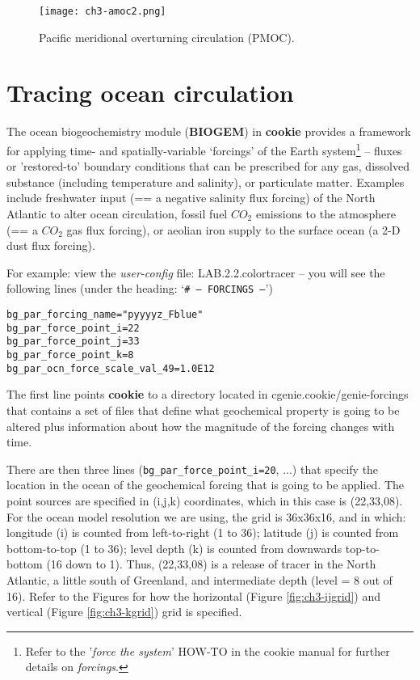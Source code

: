 \begin{figure}
\texttt{[image: ch3-amoc2.png]}\centering
\vspace{-0mm}
\caption{Pacific meridional overturning circulation (PMOC).}
\label{fig:ch3-amoc2}
\end{figure}

\newpage

\section{Tracing ocean circulation}

The ocean biogeochemistry module (\textbf{BIOGEM}) in \textbf{cookie} provides a framework for applying time- and spatially-variable ‘forcings’ of the Earth system\footnote{Refer to the '\textit{force the system}' \textsf{HOW-TO} in the cookie manual for further details on \textit{forcings}.} – fluxes or 'restored-to' boundary conditions that can be prescribed for any gas, dissolved substance (including temperature and salinity), or particulate matter. Examples include freshwater input (== a negative salinity flux forcing) of the North Atlantic to alter ocean circulation, fossil fuel \(CO_{2}\) emissions to the atmosphere (== a \(CO_{2}\) gas flux forcing), or aeolian iron supply to the surface ocean (a 2-D dust flux forcing).

\vspace{1mm}
For example: view the \textit{user-config} file: \textsf{\footnotesize LAB.2.2.colortracer} – you will see the following lines (under the heading: ‘\texttt{\# --- FORCINGS ---}’)

\vspace{-2mm}\small
\begin{verbatim}
bg_par_forcing_name="pyyyyz_Fblue"
bg_par_force_point_i=22
bg_par_force_point_j=33
bg_par_force_point_k=8
bg_par_ocn_force_scale_val_49=1.0E12
\end{verbatim}
\normalsize\vspace{-2mm}

The first line points \textbf{cookie} to a directory located in \textsf{\footnotesize cgenie.cookie/genie-forcings} that contains a set of files that define what geochemical property is going to be altered plus information about how the magnitude of the forcing changes with time.

There are then three lines (\texttt{bg\_par\_force\_point\_i=20}, ...) that specify the location in the ocean of the geochemical forcing that is going to be applied. The point sources are specified in (i,j,k) coordinates, which in this case is (22,33,08). For the ocean model resolution we are using, the grid is 36x36x16, and in which: longitude (i) is counted from left-to-right (1 to 36); latitude (j) is counted from bottom-to-top (1 to 36); level depth (k) is counted from downwards top-to-bottom (16 down to 1). Thus, (22,33,08) is a release of tracer in the North Atlantic, a little south of Greenland, and intermediate depth (level = 8 out of 16). Refer to the Figures for how the horizontal (Figure \ref{fig:ch3-ijgrid}) and vertical (Figure \ref{fig:ch3-kgrid}) grid is specified.

